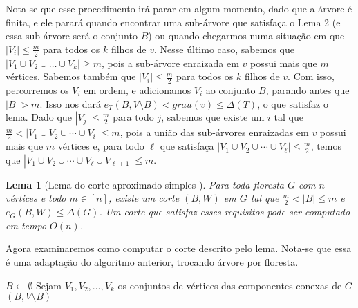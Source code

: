 \documentclass[a4paper,12pt]{article}
\newtheorem{lem}{Lema}
\begin{document}
	Nota-se que esse procedimento irá parar em algum momento, dado que a árvore 
	é finita, e ele parará quando encontrar
	uma sub-árvore que satisfaça o Lema 2 (e essa sub-árvore será o conjunto $B$) 
	ou quando chegarmos numa situação em que  
	$|V_i|\le \frac{m}{2}$ para todos os $k$ filhos de $v$.
	Nesse último caso, sabemos que $|V_1\cup V_2\cup \ldots \cup V_k|\ge m$, pois
	a sub-árvore enraizada em $v$ possui mais que $m$ vértices. 
	Sabemos também que $|V_i|\le \frac{m}{2}$ para todos os $k$ filhos de $v$. 
	Com isso, percorremos os $V_i$ em ordem, e 
	adicionamos $V_i$ ao conjunto $B$, parando antes que $|B| > m$. Isso nos dará
	$e_T(B,V\setminus B) < grau(v) \le \Delta(T)$, o que satisfaz o lema.
	Dado que $|V_j|\le \frac{m}{2}$ para todo $j$,
	sabemos que existe um $i$ tal que 
	$\frac{m}{2} < |V_1 \cup V_2 \cup \cdots \cup V_i| \le m$, pois
	a união das sub-árvores
	enraizadas em $v$ possui mais que $m$ vértices e, para todo $\ell$ que satisfaça
	$|V_1\cup V_2\cup \cdots \cup V_\ell|\le \frac{m}{2}$, temos que 
	$|V_1\cup V_2\cup \cdots \cup V_\ell\cup V_{\ell+1}|\le m$.


\bigskip
\bigskip
\bigskip
\bigskip
\bigskip
\bigskip
\bigskip
\bigskip

\begin{lem}[Lema do corte aproximado simples {\cite[Lemma 2]{Schmidt15}}]

	Para toda floresta $G$ com $n$ vértices e todo $m \in [n]$,
	existe um corte $(B,W)$ em $G$ tal que 
	$\frac{m}{2} <|B| \le m$ e
	$e_G(B,W) \le \Delta(G)$.
	Um corte que satisfaz esses requisitos pode ser computado em
	tempo $O(n)$.
\end{lem}

\medskip

Agora examinaremos como computar o corte descrito pelo lema.
Nota-se que essa é uma adaptação do algoritmo anterior, 
trocando árvore por floresta.

\medskip
\medskip

\begin{algorithm}[H]

	\caption{Computa corte aproximado simples em uma floresta}
	$B \gets \emptyset$\;
	Sejam $V_1, V_2,\ldots, V_k$ os conjuntos de vértices das
	componentes conexas de $G$\;
	\Return $(B,V\setminus B)$\;

\end{algorithm}	
\end{document}
